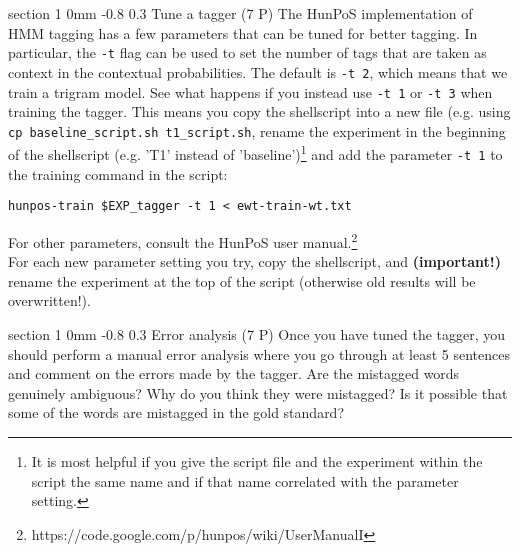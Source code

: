\documentclass[11pt]{article}
\makeatletter
\newcommand{\newsec}[2]{\section{#1}\label{sec:#2}\noindent}
\renewcommand{\section}{\@startsection
{section}%
{1}%
{0mm}%
{-0.8\baselineskip}%
{0.3\baselineskip}%
{\bfseries\large}}%
\makeatother
\begin{document}
\newsec{Tune a tagger (7 P)}{tune}%
The HunPoS implementation of HMM tagging has a few parameters that can
be tuned for better tagging. In particular, the {\tt -t} flag can be
used to set the number of tags that are taken as context in the
contextual probabilities. The default is {\tt -t $\!\!$2}, which means
that we train a trigram model. See what happens if you instead use
{\tt -t $\!\!$1} or {\tt -t $\!\!$3} when training the tagger. This
means you copy the shellscript into a new file (e.g. using \texttt{cp
  baseline\_script.sh t1\_script.sh}, rename the experiment in the
beginning of the shellscript (e.g. 'T1' instead of
'baseline')\footnote{It is most helpful if you give the script file
  and the experiment within the script the same name and if that name
  correlated with the parameter setting.} and add the parameter
\texttt{-t 1} to the training command in the script:
\begin{verbatim}
hunpos-train $EXP_tagger -t 1 < ewt-train-wt.txt
\end{verbatim}
For other parameters, consult the HunPoS user manual.\footnote{https://code.google.com/p/hunpos/wiki/UserManualI}\\
For each new parameter setting you try, copy the shellscript, and
\textbf{(important!)} rename the experiment at the top of the script
(otherwise old results will be overwritten!).

\newsec{Error analysis (7 P)}{error}%
Once you have tuned the tagger, you should perform a manual error
analysis where you go through at least 5 sentences and comment on the
errors made by the tagger.  Are the mistagged words genuinely
ambiguous? Why do you think they were mistagged? Is it possible that
some of the words are mistagged in the gold standard?
\end{document}

